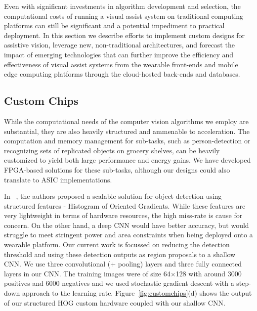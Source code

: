 Even with significant investments in algorithm development and
selection, the computational costs of running a visual assist system
on traditional computing platforms can still be significant and a
potential impediment to practical deployment. In this section we
describe efforts to implement custom designs for assistive vision,
leverage new, non-traditional architectures, and forecast the impact
of emerging technologies that can further improve the efficiency and
effectiveness of visual assist systems from the wearable front-ends
and mobile edge computing platforms through the cloud-hosted back-ends
and databases.

\subsection{Custom Chips}
While the computational needs of the computer vision algorithms we
employ are substantial, they are also heavily structured and ammenable
to acceleration. The computation and memory management for sub-tasks,
such as person-detection or recognizing sets of replicated objects on
grocery shelves, can be heavily customized to yield both large
performance and energy gains. We have developed FPGA-based solutions
for these sub-tasks, although our designs could also translate to ASIC
implementations.

In ~\cite{fpl2015}, the authors proposed a scalable solution for object 
detection using structured features - Histogram of Oriented Gradients.
While these features are very lightweight in terms of hardware resources, 
the high miss-rate is cause for concern. On the other hand, a deep CNN 
would have better accuracy, but would struggle to meet stringent power 
and area constraints when being deployed onto a wearable platform. Our 
current work is focussed on reducing the detection threshold and using 
these detection outputs as region proposals to a shallow CNN. 
We use three convolutional (+ pooling) layers and three fully connected layers in our CNN. 
The training images were of size 64$\times$128 with around 3000 positives and 6000 negatives
and we used stochastic gradient descent with a step-down approach to the learning rate. 
Figure~\ref{fig:customchips}(d) shows the output of our structured HOG
custom hardware coupled with our shallow CNN.

